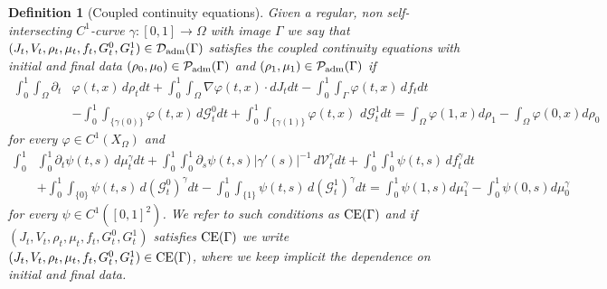 \documentclass{article}
\newtheorem{definition}[theorem]{Definition}
\begin{document}
\begin{definition}[Coupled continuity equations]\label{def:conteq}
Given a regular, non self-intersecting $C^1$-curve $\gamma : [0,1] \rightarrow \Omega$ with image $\Gamma$  we say that $(J_t,V_t,\rho_t,\mu_t,f_t,G^0_t,G_t^1) \in  \mathcal{D}_{\rm adm}(\Gamma)$ satisfies the coupled  continuity equations with initial and final data $(\rho_0,\mu_0) \in \mathcal{P}_{\rm adm}(\Gamma)$ and $(\rho_1,\mu_1) \in \mathcal{P}_{\rm adm}(\Gamma)$ if 
\begin{align}\label{eq:cont1}
\int_0^1\int_{\Omega} \partial_t & \varphi(t,x)\, d\rho_t dt  + \int_0^1\int_{\Omega} \nabla \varphi(t,x) \cdot dJ_t dt - \int_0^1\int_\Gamma \varphi(t,x)\, df_t dt \nonumber\\
& - \int_0^1 \int_{\{\gamma(0)\}} \varphi(t,x)\,d \mathcal{G}_t^0 dt + \int_0^1 \int_{\{\gamma(1)\}} \varphi(t,x)\, \,d \mathcal{G}_t^1 dt = \int_\Omega \varphi(1,x) d\rho_1 - \int_\Omega \varphi(0,x) d\rho_0
\end{align}
for every $\varphi \in C^1(X_\Omega)$ and     
\begin{align}\label{eq:cont2}
\int_0^1& \int_{0}^1 \partial_t \psi(t,s)  \, d\mu_t^\gamma dt  + \int_0^1\int_0^1 \partial_s \psi(t,s) |\gamma'(s)|^{-1} \, d\mathcal{V}_t^\gamma dt + \int_0^1\int_0^1 \psi(t,s)\, df_t^\gamma dt \nonumber \\
& + \int_0^1 \int_{\{0\}
}\psi(t,s)\,d (\mathcal{G}_t^0)^\gamma dt - \int_0^1 \int_{\{1\}}\psi(t,s)\,d (\mathcal{G}_t^1)^\gamma dt= \int_0^1 \psi(1,s) d\mu^\gamma_{1} - \int_0^1 \psi(0,s) d\mu^\gamma_{0}
\end{align}
for every $\psi \in C^1([0,1]^2)$. We refer to such conditions as ${\rm CE}(\Gamma)$ and if $(J_t,V_t,\rho_t,\mu_t,f_t,G^0_t,G^1_t)$ satisfies ${\rm CE}(\Gamma)$ we write $(J_t,V_t,\rho_t,\mu_t,f_t,G^0_t,G^1_t) \in {\rm CE}(\Gamma)$, where we keep implicit the dependence on initial and final data.
\end{definition}
\end{document}
